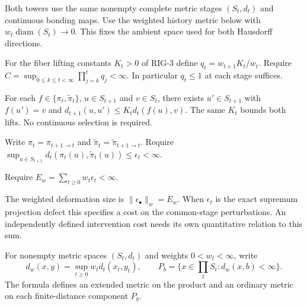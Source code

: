 \begin{assumption}\label{ass:rig1}
Both towers use the same nonempty complete metric stages $(S_t,d_t)$ and continuous bonding maps. Use the weighted history metric below with $w_t\operatorname{diam}(S_t)\to0$. This fixes the ambient space used for both Hausdorff directions.
\end{assumption}

\begin{assumption}\label{ass:rig2}
For the fiber lifting constants $K_t>0$ of RIG-3 define $q_t=w_{t+1}K_t/w_t$. Require $C=\sup_{0\leq k\leq t<\infty}\prod_{j=k}^t q_j<\infty$. In particular $q_t\leq1$ at each stage suffices.
\end{assumption}

\begin{assumption}\label{ass:rig3}
For each $f\in\{\pi_t,\widetilde\pi_t\}$, $u\in S_{t+1}$ and $v\in S_t$, there exists $u'\in S_{t+1}$ with $f(u')=v$ and $d_{t+1}(u,u')\leq K_t d_t(f(u),v)$. The same $K_t$ bounds both lifts. No continuous selection is required.
\end{assumption}

\begin{assumption}\label{ass:rig4}
Write $\pi_t=\pi_{t+1\to t}$ and $\widetilde\pi_t=\widetilde\pi_{t+1\to t}$. Require $\sup_{u\in S_{t+1}} d_t(\pi_t(u),\widetilde\pi_t(u))\leq\epsilon_t<\infty$.
\end{assumption}

\begin{assumption}\label{ass:rig5}
Require $E_w=\sum_{t\geq0}w_t\epsilon_t<\infty$.
\end{assumption}

\begin{definition}
The weighted deformation size is $\|\epsilon_\bullet\|_w=E_w$. When $\epsilon_t$ is the exact supremum projection defect this specifies a cost on the common-stage perturbations. An independently defined intervention cost needs its own quantitative relation to this sum.
\end{definition}

\begin{definition}\label{def:weighted-metric}
For nonempty metric spaces $(S_t,d_t)$ and weights $0<w_t<\infty$, write
\[
 d_w(x,y)=\sup_{t\geq0} w_t d_t(x_t,y_t),\qquad
 P_b=\{x\in\textstyle\prod_t S_t:d_w(x,b)<\infty\}.
\]
The formula defines an extended metric on the product and an ordinary metric on each finite-distance component $P_b$.
\end{definition}

